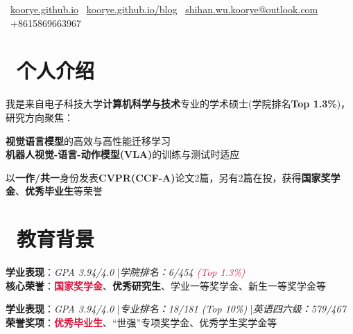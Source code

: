 \documentclass{resume}
\begin{document}

\vspace{5pt}

\vspace{5pt}

\centerline{\sffamily\large{
\faHome\ \href{https://koorye.github.io}{koorye.github.io}
\textperiodcentered\faLink\ \href{https://koorye.github.io/blog}{koorye.github.io/blog}
\textperiodcentered\faEnvelope\ \href{mailto:shihan.wu.koorye@outlook.com}{shihan.wu.koorye@outlook.com}
\textperiodcentered\faPhone\ +8615869663967
}}

\vspace{10pt}
\section{\faUser\ 个人介绍}

我是来自电子科技大学\textbf{计算机科学与技术}专业的学术硕士(学院排名\textbf{Top 1.3\%})，研究方向聚焦：

\faAngleRight \textbf{视觉语言模型}的高效与高性能迁移学习 \\
\faAngleRight \textbf{机器人视觉-语言-动作模型(VLA)}的训练与测试时适应

以\textbf{一作/共一}身份发表\textbf{CVPR(CCF-A)}论文2篇，另有2篇在投，获得\textbf{国家奖学金}、\textbf{优秀毕业生}等荣誉

\section{\faGraduationCap\ 教育背景}
\faAngleRight\textbf{学业表现}：\textit{GPA 3.94/4.0} \quad|\quad \textit{学院排名：6/454 \textcolor{crimson}{(Top 1.3\%)}} \\
\faAngleRight\textbf{核心荣誉}：\textbf{\textcolor{crimson}{国家奖学金}}、\textbf{优秀研究生}、学业一等奖学金、新生一等奖学金等

\vspace{5pt}
\faAngleRight\textbf{学业表现}：\textit{GPA 3.94/4.0} \quad|\quad \textit{专业排名：18/181 (Top 10\%)} \quad|\quad \textit{英语四六级：579/467} \\
\faAngleRight\textbf{荣誉奖项}：\textbf{\textcolor{crimson}{优秀毕业生}}、“世强”专项奖学金、优秀学生奖学金等
\end{document}
